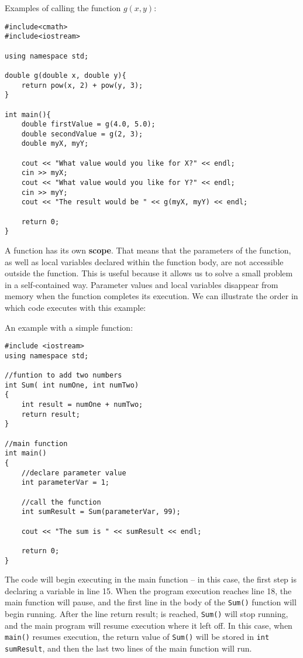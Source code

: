 \begin{example}
    Examples of calling the function $g(x,y)$:

    \begin{verbatim}
#include<cmath>
#include<iostream>

using namespace std;

double g(double x, double y){
    return pow(x, 2) + pow(y, 3);
} 

int main(){
    double firstValue = g(4.0, 5.0);
    double secondValue = g(2, 3); 
    double myX, myY;

    cout << "What value would you like for X?" << endl;
    cin >> myX;
    cout << "What value would you like for Y?" << endl;
    cin >> myY;
    cout << "The result would be " << g(myX, myY) << endl;

    return 0;
}

    \end{verbatim}
\end{example}

A function has its own \textbf{scope}. That means that the parameters of the function, as well as local variables declared within the function body, are not accessible outside the function. This is useful because it allows us to solve a small problem in a self-contained way. Parameter values and local variables disappear from memory when the function completes its execution. We can illustrate the order in which code executes with this example:

\begin{example}
    An example with a simple function:
\begin{verbatim}
#include <iostream>
using namespace std;

//funtion to add two numbers
int Sum( int numOne, int numTwo)
{
    int result = numOne + numTwo;
    return result;
}

//main function
int main()
{
    //declare parameter value
    int parameterVar = 1;
    
    //call the function
    int sumResult = Sum(parameterVar, 99);
    
    cout << "The sum is " << sumResult << endl;
    
    return 0;
}    
\end{verbatim}
\end{example}

The code will begin executing in the main function -- in this case, the first step is declaring a variable in line 15. When the program execution reaches line 18, the main function will pause, and the first line in the body of the \texttt{Sum()} function will begin running. After the line return result; is reached, \texttt{Sum()} will stop running, and the main program will resume execution where it left off. In this case, when \texttt{main()} resumes execution, the return value of \texttt{Sum()} will be stored in \texttt{int sumResult}, and then the last two lines of the main function will run.

